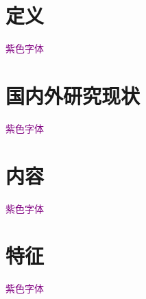 
\section{定义}
\textcolor{purple}{紫色字体}

\section{国内外研究现状}
\textcolor{purple}{紫色字体}


\section{内容}

\textcolor{purple}{紫色字体}

\section{特征}
\textcolor{purple}{紫色字体}
